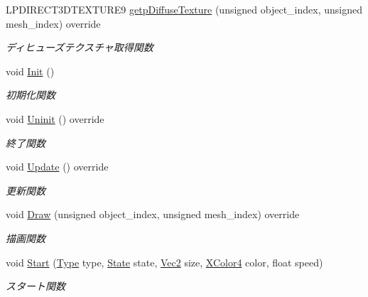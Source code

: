 \begin{DoxyCompactItemize}
L\+P\+D\+I\+R\+E\+C\+T3\+D\+T\+E\+X\+T\+U\+R\+E9 \mbox{\hyperlink{class_fade_ab971b8bb17f81d73e0405291a6512a39}{getp\+Diffuse\+Texture}} (unsigned object\+\_\+index, unsigned mesh\+\_\+index) override
\begin{DoxyCompactList}\small\item\em ディヒューズテクスチャ取得関数 \end{DoxyCompactList}\item 
void \mbox{\hyperlink{class_fade_ac2a47819e1390abcae3259bcb42bddf5}{Init}} ()
\begin{DoxyCompactList}\small\item\em 初期化関数 \end{DoxyCompactList}\item 
void \mbox{\hyperlink{class_fade_ae77d06811869d3c8162a42c3e0e14f7f}{Uninit}} () override
\begin{DoxyCompactList}\small\item\em 終了関数 \end{DoxyCompactList}\item 
void \mbox{\hyperlink{class_fade_a332851a9b9fc0b9e3bd0f536f9026004}{Update}} () override
\begin{DoxyCompactList}\small\item\em 更新関数 \end{DoxyCompactList}\item 
void \mbox{\hyperlink{class_fade_a84a9e688650ac500e03cde74ff0210b8}{Draw}} (unsigned object\+\_\+index, unsigned mesh\+\_\+index) override
\begin{DoxyCompactList}\small\item\em 描画関数 \end{DoxyCompactList}\item 
void \mbox{\hyperlink{class_fade_a47bd131483ff8124e059cf502de8e24a}{Start}} (\mbox{\hyperlink{class_fade_ac06f27215b454aa05b93c236476d6e80}{Type}} type, \mbox{\hyperlink{class_fade_ae77826bf3ff2ab95fb7b3b6f95cba80a}{State}} state, \mbox{\hyperlink{_vector3_d_8h_a5ef6e95dfc5f9d3820b71772d99bbc25}{Vec2}} size, \mbox{\hyperlink{_vector3_d_8h_a680c30c4a07d86fe763c7e01169cd6cc}{X\+Color4}} color, float speed)
\begin{DoxyCompactList}\small\item\em スタート関数 \end{DoxyCompactList}\end{DoxyCompactItemize}
